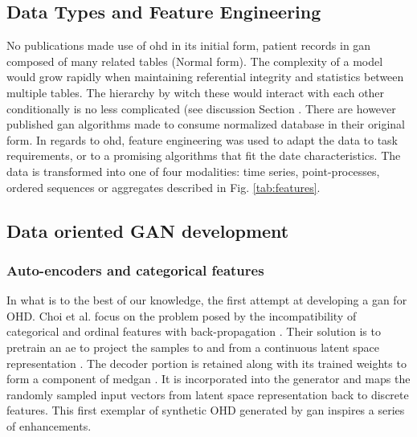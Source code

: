             

    \subsection{Data Types and Feature Engineering}

        No publications made use of \gls{ohd} in its initial form, patient records in \gls{gan} composed of many related tables (Normal form). The complexity of a model would grow rapidly when maintaining referential integrity and statistics between multiple tables. The hierarchy by witch these would interact with each other conditionally is no less complicated (see discussion Section . There are however published \gls{gan} algorithms made to consume normalized database in their original form. \todo In regards to \gls{ohd}, feature engineering was used to adapt the data to task requirements, or to a promising algorithms that fit the date characteristics. The data is transformed into one of four modalities: time series, point-processes, ordered sequences or aggregates described in Fig. \ref{tab:features}.

        

    \subsection{Data oriented GAN development}\label{subsec:data_gan_dev}

        \subsubsection{Auto-encoders and categorical features}\label{subsubsec:categorical}

            In what is to the best of our knowledge, the first attempt at developing a \gls{gan} for OHD. Choi et al. focus on the problem posed by the incompatibility of categorical and ordinal features with back-propagation . Their solution is to pretrain an \gls{ae} to project the samples to and from a continuous latent space representation . The decoder portion is retained along with its trained weights to form a component of \gls{medgan} \cite{Choi2017-nt}. It is incorporated into the generator and maps the randomly sampled input vectors from latent space representation back to discrete features. This first exemplar of synthetic OHD generated by \gls{gan} inspires a series of enhancements.\par

